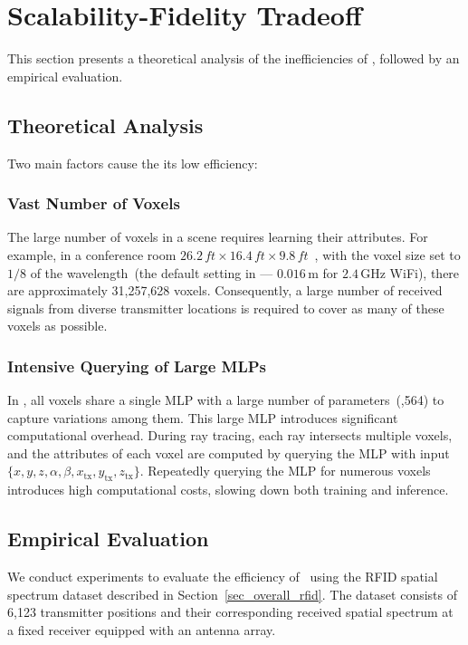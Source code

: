 

\section{Scalability-Fidelity Tradeoff}\label{sec_nerf2_tradeoff}

This section presents a theoretical analysis of the inefficiencies of \nerft, followed by an empirical evaluation.


\subsection{Theoretical Analysis}\label{sec_theoretical_ana}
Two main factors cause the its low efficiency:

\subsubsection{Vast Number of Voxels}  
The large number of voxels in a scene requires learning their attributes. 
For example, in a conference room \(26.2\,\textit{ft} \times 16.4\,\textit{ft} \times 9.8\,\textit{ft}\)~\cite{matlab_conference_room}, with the voxel size set to \(1/8\) of the wavelength~(the default setting in \nerft — \(0.016\,\text{m}\) for \(2.4\,\text{GHz}\) WiFi), there are approximately 31,257,628 voxels.  
Consequently, a large number of received signals from diverse transmitter locations is required to cover as many of these voxels as possible.


\subsubsection{Intensive Querying of Large MLPs}
In \nerft, all voxels share a single MLP with a large number of parameters~(,564) to capture variations among them. 
This large MLP introduces significant computational overhead. 
During ray tracing, each ray intersects multiple voxels, and the attributes of each voxel are computed by querying the MLP with input~\(\{x, y, z, \alpha, \beta, x_{\text{tx}}, y_{\text{tx}}, z_{\text{tx}}\}\).
Repeatedly querying the MLP for numerous voxels introduces high computational costs, slowing down both training and inference.



\subsection{Empirical Evaluation}
We conduct experiments to evaluate the efficiency of \nerft\ using the RFID spatial spectrum dataset described in Section~\ref{sec_overall_rfid}.  
The dataset consists of 6,123 transmitter positions and their corresponding received spatial spectrum at a fixed receiver equipped with an antenna array.



